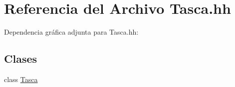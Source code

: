 \hypertarget{_tasca_8hh}{\section{Referencia del Archivo Tasca.\-hh}
\label{_tasca_8hh}
}
Dependencia gráfica adjunta para Tasca.\-hh\-:
\subsection*{Clases}
\begin{DoxyCompactItemize}
\item 
class \hyperlink{class_tasca}{Tasca}
\end{DoxyCompactItemize}
